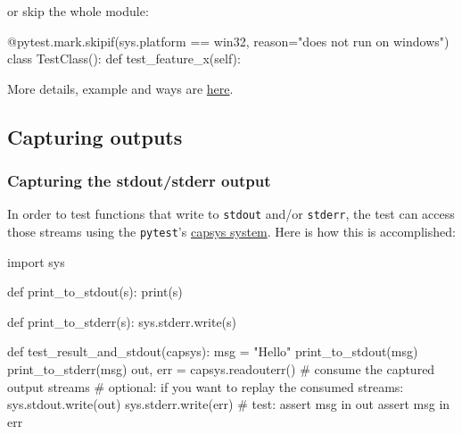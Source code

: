 \documentclass[
]{report}
\newenvironment{Shaded}{\begin{snugshade}}{\end{snugshade}}
\newcommand{\AttributeTok}[1]{\textcolor[rgb]{0.40,0.45,0.13}{#1}}
\newcommand{\BuiltInTok}[1]{\textcolor[rgb]{0.00,0.23,0.31}{#1}}
\newcommand{\CommentTok}[1]{\textcolor[rgb]{0.37,0.37,0.37}{#1}}
\newcommand{\ControlFlowTok}[1]{\textcolor[rgb]{0.00,0.23,0.31}{#1}}
\newcommand{\ImportTok}[1]{\textcolor[rgb]{0.00,0.46,0.62}{#1}}
\newcommand{\KeywordTok}[1]{\textcolor[rgb]{0.00,0.23,0.31}{#1}}
\newcommand{\NormalTok}[1]{\textcolor[rgb]{0.00,0.23,0.31}{#1}}
\newcommand{\OperatorTok}[1]{\textcolor[rgb]{0.37,0.37,0.37}{#1}}
\newcommand{\StringTok}[1]{\textcolor[rgb]{0.13,0.47,0.30}{#1}}
\newcommand{\VariableTok}[1]{\textcolor[rgb]{0.07,0.07,0.07}{#1}}
\begin{document}
\begin{itemize}
  or skip the whole module:

\begin{Shaded}
\begin{Highlighting}[]
\AttributeTok{@pytest.mark.skipif}\NormalTok{(sys.platform }\OperatorTok{==} \StringTok{\textquotesingle{}win32\textquotesingle{}}\NormalTok{, reason}\OperatorTok{=}\StringTok{"does not run on windows"}\NormalTok{)}
\KeywordTok{class}\NormalTok{ TestClass():}
    \KeywordTok{def}\NormalTok{ test\_feature\_x(}\VariableTok{self}\NormalTok{):}
\end{Highlighting}
\end{Shaded}
\end{itemize}

More details, example and ways are
\href{https://docs.pytest.org/en/latest/skipping.html}{here}.

\subsection{Capturing outputs}\label{capturing-outputs}

\subsubsection{Capturing the stdout/stderr
output}\label{capturing-the-stdoutstderr-output}

In order to test functions that write to \texttt{stdout} and/or
\texttt{stderr}, the test can access those streams using the
\texttt{pytest}'s
\href{https://docs.pytest.org/en/latest/capture.html}{capsys system}.
Here is how this is accomplished:

\begin{Shaded}
\begin{Highlighting}[]
\ImportTok{import}\NormalTok{ sys}

\KeywordTok{def}\NormalTok{ print\_to\_stdout(s):}
    \BuiltInTok{print}\NormalTok{(s)}


\KeywordTok{def}\NormalTok{ print\_to\_stderr(s):}
\NormalTok{    sys.stderr.write(s)}


\KeywordTok{def}\NormalTok{ test\_result\_and\_stdout(capsys):}
\NormalTok{    msg }\OperatorTok{=} \StringTok{"Hello"}
\NormalTok{    print\_to\_stdout(msg)}
\NormalTok{    print\_to\_stderr(msg)}
\NormalTok{    out, err }\OperatorTok{=}\NormalTok{ capsys.readouterr()  }\CommentTok{\# consume the captured output streams}
    \CommentTok{\# optional: if you want to replay the consumed streams:}
\NormalTok{    sys.stdout.write(out)}
\NormalTok{    sys.stderr.write(err)}
    \CommentTok{\# test:}
    \ControlFlowTok{assert}\NormalTok{ msg }\KeywordTok{in}\NormalTok{ out}
    \ControlFlowTok{assert}\NormalTok{ msg }\KeywordTok{in}\NormalTok{ err}
\end{Highlighting}
\end{Shaded}
\end{document}
